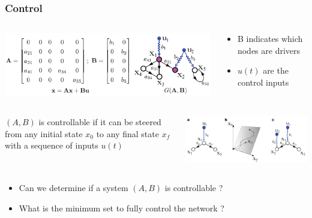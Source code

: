 \documentclass[xcolor=dvipsnames]{beamer}
\begin{document}
\begin{frame}
	\frametitle{Control}
	
	\begin{columns}
		\begin{column}{.6\textwidth}
			\includegraphics[scale=.55]{control}
		\end{column}
		\begin{column}{.4\textwidth}		
			\begin{itemize}
				\item B indicates which nodes are drivers
				\item $u(t)$ are the control inputs
			\end{itemize}
		\end{column}
	\end{columns}
	
	\begin{columns}
		\begin{column}{.5\textwidth}
			 $(A,B)$ is controllable if it can be steered from any initial state $ x_0 $ to any final state $ x_f $ with a sequence of inputs $u(t)$
		\end{column}
		\begin{column}{.5\textwidth}
			\includegraphics[scale=.55]{control2}
		\end{column}
	\end{columns}
	\begin{itemize}
		\item Can we determine if a system $(A,B)$ is controllable ?
		\item What is the minimum set to fully control the network ?
	\end{itemize}
\end{frame}
\end{document}
